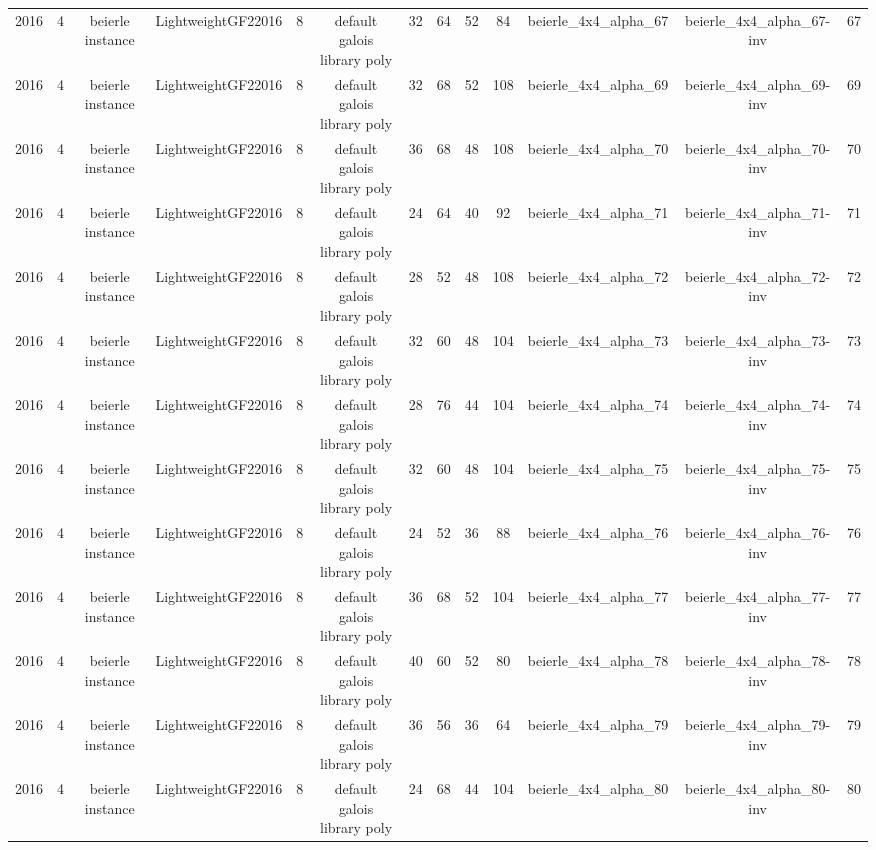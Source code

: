 \begin{tabular}{c c c c c c c c c c c c c}
2016 & 4 & beierle instance & LightweightGF22016 & 8 & default galois library poly & 32 & 64 & 52 & 84 & beierle_4x4_alpha_67 & beierle_4x4_alpha_67-inv & 67 \\
2016 & 4 & beierle instance & LightweightGF22016 & 8 & default galois library poly & 32 & 68 & 52 & 108 & beierle_4x4_alpha_69 & beierle_4x4_alpha_69-inv & 69 \\
2016 & 4 & beierle instance & LightweightGF22016 & 8 & default galois library poly & 36 & 68 & 48 & 108 & beierle_4x4_alpha_70 & beierle_4x4_alpha_70-inv & 70 \\
2016 & 4 & beierle instance & LightweightGF22016 & 8 & default galois library poly & 24 & 64 & 40 & 92 & beierle_4x4_alpha_71 & beierle_4x4_alpha_71-inv & 71 \\
2016 & 4 & beierle instance & LightweightGF22016 & 8 & default galois library poly & 28 & 52 & 48 & 108 & beierle_4x4_alpha_72 & beierle_4x4_alpha_72-inv & 72 \\
2016 & 4 & beierle instance & LightweightGF22016 & 8 & default galois library poly & 32 & 60 & 48 & 104 & beierle_4x4_alpha_73 & beierle_4x4_alpha_73-inv & 73 \\
2016 & 4 & beierle instance & LightweightGF22016 & 8 & default galois library poly & 28 & 76 & 44 & 104 & beierle_4x4_alpha_74 & beierle_4x4_alpha_74-inv & 74 \\
2016 & 4 & beierle instance & LightweightGF22016 & 8 & default galois library poly & 32 & 60 & 48 & 104 & beierle_4x4_alpha_75 & beierle_4x4_alpha_75-inv & 75 \\
2016 & 4 & beierle instance & LightweightGF22016 & 8 & default galois library poly & 24 & 52 & 36 & 88 & beierle_4x4_alpha_76 & beierle_4x4_alpha_76-inv & 76 \\
2016 & 4 & beierle instance & LightweightGF22016 & 8 & default galois library poly & 36 & 68 & 52 & 104 & beierle_4x4_alpha_77 & beierle_4x4_alpha_77-inv & 77 \\
2016 & 4 & beierle instance & LightweightGF22016 & 8 & default galois library poly & 40 & 60 & 52 & 80 & beierle_4x4_alpha_78 & beierle_4x4_alpha_78-inv & 78 \\
2016 & 4 & beierle instance & LightweightGF22016 & 8 & default galois library poly & 36 & 56 & 36 & 64 & beierle_4x4_alpha_79 & beierle_4x4_alpha_79-inv & 79 \\
2016 & 4 & beierle instance & LightweightGF22016 & 8 & default galois library poly & 24 & 68 & 44 & 104 & beierle_4x4_alpha_80 & beierle_4x4_alpha_80-inv & 80 \\

\end{tabular}
